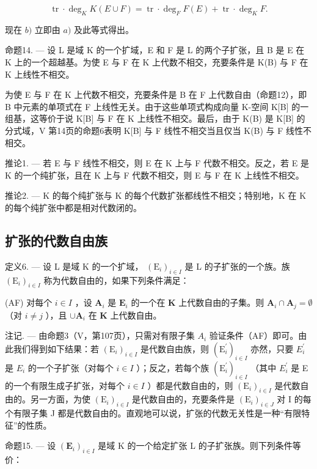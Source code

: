 \[
\operatorname{tr} \cdot \deg_ {K} K (E \cup F) = \operatorname{tr} \cdot \deg_ {F} F (E) + \operatorname{tr} \cdot \deg_ {K} F.
\]

现在 \(b)\) 立即由 \(a)\) 及此等式得出。

命题14. --- 设 L 是域 K 的一个扩域，E 和 F 是 L 的两个子扩张，且 B 是 E 在 K 上的一个超越基。为使 E 与 F 在 K 上代数不相交，充要条件是 K(B) 与 F 在 K 上线性不相交。

为使 E 与 F 在 K 上代数不相交，充要条件是 B 在 F 上代数自由（命题12），即 B 中元素的单项式在 F 上线性无关。由于这些单项式构成向量 K-空间 K{[}B{]} 的一组基，这等价于说 K{[}B{]} 与 F 在 K 上线性不相交。最后，由于 K(B) 是 K{[}B{]} 的分式域，V 第14页的命题6表明 K{[}B{]} 与 F 线性不相交当且仅当 K(B) 与 F 线性不相交。

推论1. --- 若 E 与 F 线性不相交，则 E 在 K 上与 F 代数不相交。反之，若 E 是 K 的一个纯扩张，且在 K 上与 F 代数不相交，则 E 与 F 在 K 上线性不相交。

推论2. --- K 的每个纯扩张与 K 的每个代数扩张都线性不相交；特别地，K 在 K 的每个纯扩张中都是相对代数闭的。

\subsection{扩张的代数自由族}

定义6. --- 设 L 是域 K 的一个扩域， \((\mathrm{E}_{i})_{i\in I}\) 是 L 的子扩张的一个族。族 \((\mathrm{E}_{i})_{i\in I}\) 称为代数自由的，如果下列条件满足：

(AF) 对每个 \(i \in I\) ，设 \(\mathbf{A}_i\) 是 \(\mathbf{E}_i\) 的一个在 \(\mathbf{K}\) 上代数自由的子集。则 \(\mathbf{A}_i \cap \mathbf{A}_j = \emptyset\) （对 \(i \neq j\) ），且 \(\cup \mathbf{A}_i\) 在 \(\mathbf{K}\) 上代数自由。

注记. --- 由命题3（V，第107页），只需对有限子集 \(A_{i}\) 验证条件（AF）即可。由此我们得到如下结果：若 \((\mathrm{E}_{i})_{i\in I}\) 是代数自由族，则 \((\mathrm{E}_{i}^{\prime})_{i\in I}\) 亦然，只要 \(E_{i}^{\prime}\) 是 \(E_{i}\) 的一个子扩张（对每个 \(i\in I\) ）；反之，若每个族 \((\mathrm{E}_{i}^{\prime})_{i\in I}\) （其中 \(E_{i}^{\prime}\) 是 E 的一个有限生成子扩张，对每个 \(i\in I\) ）都是代数自由的，则 \((\mathrm{E}_{i})_{i\in I}\) 是代数自由的。另一方面，为使 \((\mathrm{E}_{i})_{i\in I}\) 是代数自由的，充要条件是 \((\mathrm{E}_{i})_{i\in J}\) 对 I 的每个有限子集 J 都是代数自由的。直观地可以说，扩张的代数无关性是一种“有限特征”的性质。

命题15. --- 设 \((\mathbf{E}_i)_{i\in I}\) 是域 K 的一个给定扩张 L 的子扩张族。则下列条件等价：

